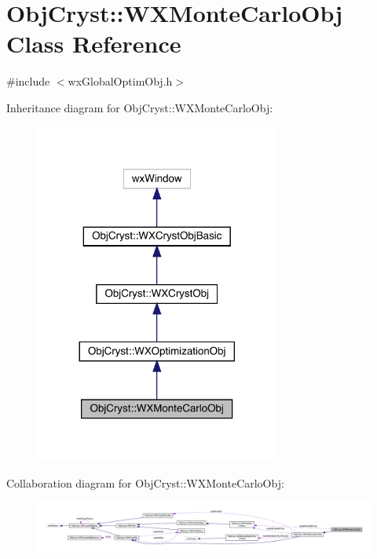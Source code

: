 \hypertarget{class_obj_cryst_1_1_w_x_monte_carlo_obj}{}\section{Obj\+Cryst\+::W\+X\+Monte\+Carlo\+Obj Class Reference}
\label{class_obj_cryst_1_1_w_x_monte_carlo_obj}


{\ttfamily \#include $<$wx\+Global\+Optim\+Obj.\+h$>$}



Inheritance diagram for Obj\+Cryst\+::W\+X\+Monte\+Carlo\+Obj\+:
\nopagebreak
\begin{figure}[H]
\begin{center}
\leavevmode
\includegraphics[width=228pt]{class_obj_cryst_1_1_w_x_monte_carlo_obj__inherit__graph}
\end{center}
\end{figure}


Collaboration diagram for Obj\+Cryst\+::W\+X\+Monte\+Carlo\+Obj\+:
\nopagebreak
\begin{figure}[H]
\begin{center}
\leavevmode
\includegraphics[width=350pt]{class_obj_cryst_1_1_w_x_monte_carlo_obj__coll__graph}
\end{center}
\end{figure}
